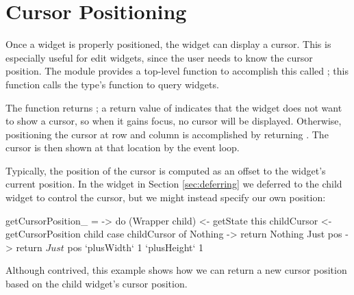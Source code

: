 \section{Cursor Positioning}

Once a widget is properly positioned, the widget can display a cursor.
This is especially useful for edit widgets, since the user needs to
know the cursor position.  The  module provides a top-level
function to accomplish this called ; this
function calls the  type's 
function to query widgets.

The  function returns ; a return value of  indicates that the
widget does not want to show a cursor, so when it gains focus, no
cursor will be displayed.  Otherwise, positioning the cursor at row
 and column  is accomplished by returning .  The cursor is then shown at that location by
the event loop.

Typically, the position of the cursor is computed as an offset to the
widget's current position.  In the  widget in Section
\ref{sec:deferring} we deferred to the child widget to control the
cursor, but we might instead specify our own position:

\begin{haskellcode}
 getCursorPosition_ = \this -> do
   (Wrapper child) <- getState this
   childCursor <- getCursorPosition child
   case childCursor of
     Nothing -> return Nothing
     Just pos -> return $ Just $ pos `plusWidth` 1 `plusHeight` 1
\end{haskellcode}

Although contrived, this example shows how we can return a new cursor
position based on the child widget's cursor position.
